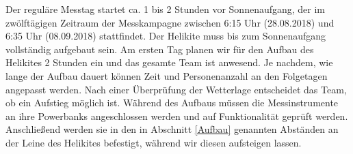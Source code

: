 \documentclass[a4paper,11pt,DIV=calc,tablecaptionabove,headinclude,twoside]{article}
\begin{document}
%

Der reguläre Messtag startet ca. 1 bis 2 Stunden vor Sonnenaufgang, der im zwölftägigen Zeitraum der Messkampagne zwischen 6:15 Uhr (28.08.2018) und 6:35 Uhr (08.09.2018) stattfindet. Der Helikite muss bis zum Sonnenaufgang vollständig aufgebaut sein. Am ersten Tag planen wir für den Aufbau des Helikites 2 Stunden ein und das gesamte Team ist anwesend. Je nachdem, wie lange der Aufbau dauert können Zeit und Personenanzahl an den Folgetagen angepasst werden. Nach einer Überprüfung der Wetterlage entscheidet das Team, ob ein Aufstieg möglich ist. Während des Aufbaus müssen die Messinstrumente an ihre Powerbanks angeschlossen werden und auf Funktionalität geprüft werden. Anschließend werden sie in den in Abschnitt \ref{Aufbau} genannten Abständen an der Leine des Helikites befestigt, während wir diesen aufsteigen lassen. \\
\end{document}
